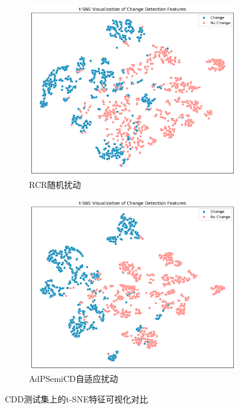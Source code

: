 \documentclass[lang=chs, degree=master, blindreview=false, adobe=false]{yanputhesis}
\begin{document}
\begin{figure}[H]
  \centering
  \hspace*{\fill} %
  \begin{subfigure}[t]{0.46\textwidth} %
      \centering
      \includegraphics[scale=0.36]{images/tsne_5RCRc.png}
      \caption{RCR随机扰动}
      \label{fig:tsneC_left}
  \end{subfigure}
  \hfill %
  \begin{subfigure}[t]{0.46\textwidth} %
      \centering
      \includegraphics[scale=0.36]{images/tsne_5AdPc.png} %
      \caption{AdPSemiCD自适应扰动} %
      \label{fig:tsneC_right}
  \end{subfigure}
  \hspace*{\fill} %
  \caption{CDD测试集上的t-SNE特征可视化对比}
  \label{fig:AdP_tsneC}
\end{figure}
\end{document}
